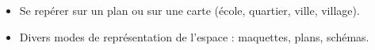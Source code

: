 \begin{prerequis}
   \begin{itemize}
      \item Se repérer sur un plan ou sur une carte (école, quartier, ville, village).
      \item Divers modes de représentation de l’espace : maquettes, plans, schémas.
   \end{itemize}
\end{prerequis}